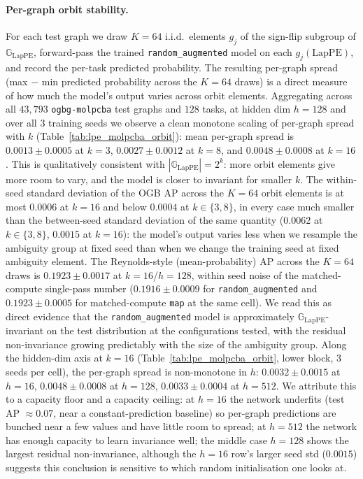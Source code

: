 \documentclass{article}
\theoremstyle{definition}
\theoremstyle{plain}
\newcommand{\G}{\mathbb{G}}
\begin{document}
\paragraph{Per-graph orbit stability.}
For each test graph we draw $K\!=\!64$ i.i.d.\ elements $g_j$ of the
sign-flip subgroup of $\G_{\mathrm{LapPE}}$, forward-pass the trained
\texttt{random\_augmented} model on each $g_j(\mathrm{LapPE})$, and
record the per-task predicted probability. The resulting per-graph
spread (max $-$ min predicted probability across the $K\!=\!64$ draws)
is a direct measure of how much the model's output varies across
orbit elements. Aggregating across all $43{,}793$ \texttt{ogbg-molpcba}
test graphs and $128$ tasks, at hidden dim $h\!=\!128$ and over all
$3$ training seeds we observe a clean monotone scaling of per-graph
spread with $k$ (Table~\ref{tab:lpe_molpcba_orbit}): mean per-graph
spread is $0.0013\!\pm\!0.0005$ at $k\!=\!3$, $0.0027\!\pm\!0.0012$
at $k\!=\!8$, and $0.0048\!\pm\!0.0008$ at $k\!=\!16$. This is
qualitatively consistent with $|\G_{\mathrm{LapPE}}|\!=\!2^{k}$:
more orbit elements give more room to vary, and the model is closer
to invariant for smaller $k$. The within-seed standard deviation of
the OGB AP across the $K\!=\!64$ orbit elements is at most $0.0006$
at $k\!=\!16$ and below $0.0004$ at $k\!\in\!\{3,8\}$, in every case
much smaller than the between-seed standard deviation of the same
quantity ($0.0062$ at $k\!\in\!\{3,8\}$, $0.0015$ at $k\!=\!16$):
the model's output varies less when we resample the ambiguity group
at fixed seed than when we change the training seed at fixed
ambiguity element. The Reynolds-style (mean-probability) AP across
the $K\!=\!64$ draws is $0.1923\!\pm\!0.0017$ at
$k\!=\!16$/$h\!=\!128$, within seed noise of the matched-compute
single-pass number ($0.1916\!\pm\!0.0009$ for
\texttt{random\_augmented} and $0.1923\!\pm\!0.0005$ for
matched-compute \texttt{map} at the same cell). We read this as
direct evidence that the \texttt{random\_augmented} model is
approximately $\G_{\mathrm{LapPE}}$-invariant on the test
distribution at the configurations tested, with the residual
non-invariance growing predictably with the size of the ambiguity
group. Along the hidden-dim axis at $k\!=\!16$
(Table~\ref{tab:lpe_molpcba_orbit}, lower block, $3$ seeds per cell),
the per-graph spread is non-monotone in $h$:
$0.0032\!\pm\!0.0015$ at $h\!=\!16$,
$0.0048\!\pm\!0.0008$ at $h\!=\!128$,
$0.0033\!\pm\!0.0004$ at $h\!=\!512$. We attribute this to a
capacity floor and a capacity ceiling: at $h\!=\!16$ the network
underfits (test AP $\approx\!0.07$, near a constant-prediction
baseline) so per-graph predictions are bunched near a few values
and have little room to spread; at $h\!=\!512$ the network has
enough capacity to learn invariance well; the middle case
$h\!=\!128$ shows the largest residual non-invariance, although the
$h\!=\!16$ row's larger seed std ($0.0015$) suggests this conclusion
is sensitive to which random initialisation one looks at.
\end{document}

